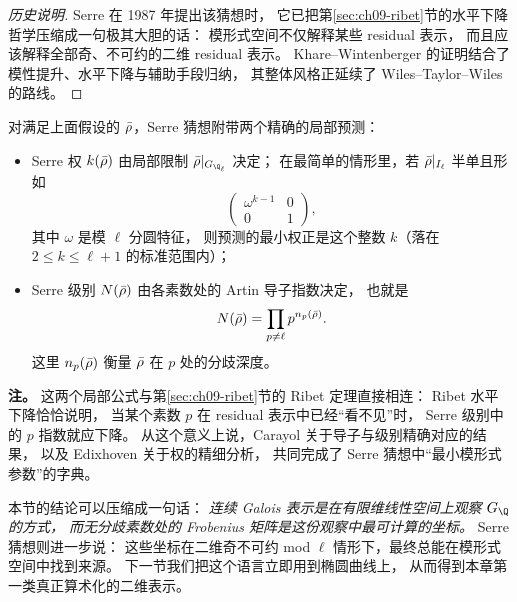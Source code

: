 \begin{proof}[历史说明]
Serre 在 1987 年提出该猜想时，
它已把第\ref{sec:ch09-ribet}节的水平下降哲学压缩成一句极其大胆的话：
模形式空间不仅解释某些 residual 表示，
而且应该解释全部奇、不可约的二维 residual 表示。
Khare--Wintenberger 的证明结合了模性提升、水平下降与辅助手段归纳，
其整体风格正延续了 Wiles--Taylor--Wiles 的路线。
\end{proof}

\begin{definition}
\label{def:ch09-serre-weight-level}
对满足上面假设的 $\bar{\rho}$，Serre 猜想附带两个精确的局部预测：
\begin{itemize}
  \item Serre 权 $k(\bar{\rho})$ 由局部限制 $\rhobar|_{G_{\Q_\ell}}$ 决定；
  在最简单的情形里，若 $\bar{\rho}|_{I_\ell}$ 半单且形如
  \[
    \begin{pmatrix}
      \omega^{k-1} & 0\\ 0 & 1
    \end{pmatrix},
  \]
  其中 $\omega$ 是模 $\ell$ 分圆特征，
  则预测的最小权正是这个整数 $k$（落在 $2\le k\le \ell+1$ 的标准范围内）；
  \item Serre 级别 $N(\bar{\rho})$ 由各素数处的 Artin 导子指数决定，
  也就是
  \[
    N(\bar{\rho})=\prod_{p\neq \ell} p^{n_p(\bar{\rho})}.
  \]
  这里 $n_p(\bar{\rho})$ 衡量 $\bar{\rho}$ 在 $p$ 处的分歧深度。
\end{itemize}
\end{definition}

\textbf{注。}
这两个局部公式与第\ref{sec:ch09-ribet}节的 Ribet 定理直接相连：
Ribet 水平下降恰恰说明，
当某个素数 $p$ 在 residual 表示中已经“看不见”时，
Serre 级别中的 $p$ 指数就应下降。
从这个意义上说，Carayol 关于导子与级别精确对应的结果，
以及 Edixhoven 关于权的精细分析，
共同完成了 Serre 猜想中“最小模形式参数”的字典。

本节的结论可以压缩成一句话：
\emph{连续 Galois 表示是在有限维线性空间上观察 $G_\Q$ 的方式，
而无分歧素数处的 Frobenius 矩阵是这份观察中最可计算的坐标。}
Serre 猜想则进一步说：
这些坐标在二维奇不可约 mod $\ell$ 情形下，最终总能在模形式空间中找到来源。
下一节我们把这个语言立即用到椭圆曲线上，
从而得到本章第一类真正算术化的二维表示。
